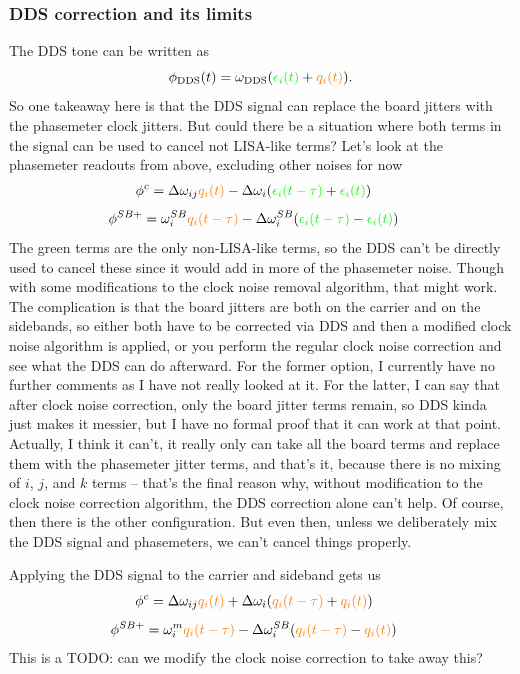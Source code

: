 \documentclass[11pt]{article}
\begin{document}
\subsubsection*{DDS correction and its limits}
The DDS tone can be written as 
\begin{equation*}
    \phi_{\text{DDS}}(t) = \omega_{\text{DDS}}({\color{green}\epsilon_i(t)} +{\color{orange}q_{i}(t)} ).
\end{equation*}
So one takeaway here is that the DDS signal can replace the board jitters with the phasemeter clock jitters. But could there be a situation where both terms in the signal can be used to cancel not LISA-like terms? Let's look at the phasemeter readouts from above, excluding other noises for now
\begin{align*}
    \phi^{c}&=\Delta \omega_{ij}{\color{orange}q_{i}(t)} - \Delta \omega_i({\color{green}\epsilon_{i}(t-\tau)}+{\color{green}\epsilon_{i}(t)})
\end{align*}
\begin{align*}
    \phi^{SB+}&= \omega_i^{SB}{\color{orange}q_{i}(t-\tau)} - \Delta \omega_i^{SB}({\color{green}\epsilon_{i}(t-\tau)} -{\color{green}\epsilon_{i}(t)})
\end{align*}
The green terms are the only non-LISA-like terms, so the DDS can't be directly used to cancel these since it would add in more of the phasemeter noise. Though with some modifications to the clock noise removal algorithm, that might work. The complication is that the board jitters are both on the carrier and on the sidebands, so either both have to be corrected via DDS and then a modified clock noise algorithm is applied, or you perform the regular clock noise correction and see what the DDS can do afterward. For the former option, I currently have no further comments as I have not really looked at it. For the latter, I can say that after clock noise correction, only the board jitter terms remain, so DDS kinda just makes it messier, but I have no formal proof that it can work at that point. Actually, I think it can't, it really only can take all the board terms and replace them with the phasemeter jitter terms, and that's it, because there is no mixing of $i$, $j$, and $k$ terms -- that's the final reason why, without modification to the clock noise correction algorithm, the DDS correction alone can't help. Of course, then there is the other configuration. But even then, unless we deliberately mix the DDS signal and phasemeters, we can't cancel things properly.

Applying the DDS signal to the carrier and sideband gets us
\begin{align*}
    \phi^{c}&=\Delta \omega_{ij}{\color{orange}q_{i}(t)} + \Delta \omega_i({\color{orange}q_{i}(t-\tau)}+{\color{orange}q_{i}(t)})
\end{align*}
\begin{align*}
    \phi^{SB+}&= \omega_i^{m}{\color{orange}q_{i}(t-\tau)} - \Delta \omega_i^{SB}({\color{orange}q_{i}(t-\tau)} -{\color{orange}q_{i}(t)})
\end{align*}
{\color{red}This is a TODO: can we modify the clock noise correction to take away this?}
\end{document}
